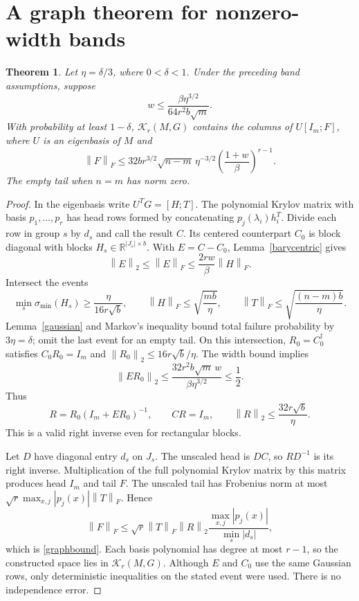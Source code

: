 \documentclass[11pt]{article}
\newtheorem{theorem}{Theorem}[section]
\newcommand{\K}{\mathcal K}
\newcommand{\R}{\mathbb R}
\newcommand{\norm}[1]{\left\lVert#1\right\rVert}
\begin{document}
\section{A graph theorem for nonzero-width bands}
\begin{theorem}\label{graph}
Let $\eta=\delta/3$, where $0<\delta<1$. Under the preceding band assumptions,
suppose
\begin{equation}\label{width}
 w\le\frac{\beta\eta^{3/2}}{64r^2b\sqrt m}.
\end{equation}
With probability at least $1-\delta$, $\K_r(M,G)$ contains the columns of
$U[I_m;F]$, where $U$ is an eigenbasis of $M$ and
\begin{equation}\label{graphbound}
 \norm{F}_F\le32b r^{3/2}\sqrt{n-m}\,\eta^{-3/2}
 \left(\frac{1+w}{\beta}\right)^{r-1}.
\end{equation}
The empty tail when $n=m$ has norm zero.
\end{theorem}
\begin{proof}
In the eigenbasis write $U^TG=[H;T]$. The polynomial Krylov matrix with
basis $p_1,\ldots,p_r$ has head rows formed by concatenating
$p_j(\lambda_i)h_i^T$. Divide each row in group $s$ by $d_s$ and call the
result $C$. Its centered counterpart $C_0$ is block diagonal with blocks
$H_s\in\R^{|J_s|\times b}$. With $E=C-C_0$, Lemma~\ref{barycentric} gives
\[
 \norm E_2\le\norm E_F\le\frac{2rw}{\beta}\norm H_F.
\]
Intersect the events
\[
 \min_s\sigma_{\min}(H_s)\ge\frac\eta{16r\sqrt b},\qquad
 \norm H_F\le\sqrt{\frac{mb}\eta},\qquad
 \norm T_F\le\sqrt{\frac{(n-m)b}\eta}.
\]
Lemma~\ref{gaussian} and Markov's inequality bound total failure probability
by $3\eta=\delta$; omit the last event for an empty tail. On this intersection,
$R_0=C_0^\dagger$ satisfies $C_0R_0=I_m$ and
$\norm{R_0}_2\le16r\sqrt b/\eta$. The width bound implies
\[
 \norm{ER_0}_2\le
 \frac{32r^2b\sqrt m\,w}{\beta\eta^{3/2}}\le\frac12.
\]
Thus
\[
 R=R_0(I_m+ER_0)^{-1},\qquad CR=I_m,\qquad
 \norm R_2\le\frac{32r\sqrt b}\eta.
\]
This is a valid right inverse even for rectangular blocks.

Let $D$ have diagonal entry $d_s$ on $J_s$. The unscaled head is $DC$,
so $RD^{-1}$ is its right inverse. Multiplication of the full polynomial
Krylov matrix by this matrix produces head $I_m$ and tail $F$. The unscaled
tail has Frobenius norm at most
$\sqrt r\max_{x,j}|p_j(x)|\norm T_F$. Hence
\[
 \norm F_F\le\sqrt r\norm T_F\norm R_2
 \frac{\max_{x,j}|p_j(x)|}{\min_s|d_s|},
\]
which is \eqref{graphbound}. Each basis polynomial has degree at most $r-1$,
so the constructed space lies in $\K_r(M,G)$. Although $E$ and $C_0$ use the
same Gaussian rows, only deterministic inequalities on the stated event were
used. There is no independence error.
\end{proof}
\end{document}
